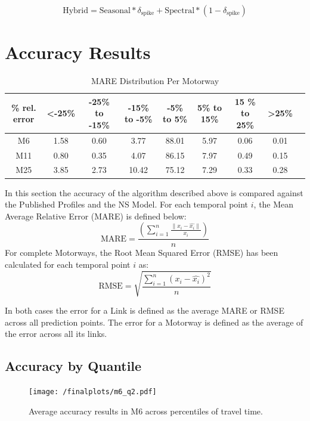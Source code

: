 \documentclass[letterpaper, 10 pt, conference]{ieeeconf}  %
\begin{document}
\begin{equation}
\textrm{Hybrid} = \textrm{Seasonal} * \delta_{\textrm{spike}} + \textrm{Spectral} * (1 - \delta_{\textrm{spike}})
\end{equation}

\section{Accuracy Results}
\begin{table}[bp]
	\caption{MARE Distribution Per Motorway}
	\centering
	\begin{center}
		\begin{tabular}{|C|C|C|C|C|C|C|C|C|}
			\hline
			\textbf{\% rel. error}&{\textless -25\%}&{-25\%\textbf{ to }-15\%}&{-15\%\textbf{ to }-5\%}&{-5\%\textbf{ to }5\%}&{5\%\textbf{ to }15\%}&{15 \%\textbf{ to }25\%}&{\textgreater 25\%}\\
			\hline
			M6& 1.58& 0.60& 3.77& 88.01& 5.97& 0.06& 0.01\\
			\hline
			M11& 0.80& 0.35& 4.07& 86.15& 7.97& 0.49& 0.15\\
			\hline
			M25& 3.85& 2.73& 10.42& 75.12& 7.29& 0.33& 0.28\\
			\hline
		\end{tabular}
		\label{mapeglobal}
	\end{center}
\end{table}
  
In this section the accuracy of the algorithm described above is compared against the Published Profiles and the NS Model. 
For each temporal point $i$, the Mean Average Relative Error (MARE) is defined below:
\begin{equation}
\textrm{MARE} =\frac{ \left( \sum_{i=1}^{n} \frac{\|x_i - \hat{x_i}\|}{x_i}\right)}{n}
\end{equation}
For complete Motorways, the Root Mean Squared Error (RMSE) has been calculated for each temporal point $i$ as:
\begin{equation}
\textrm{RMSE} = \sqrt{\frac{\sum_{i=1}^{n} (x_i - \hat{x_i})^2}{n}}
\end{equation}

In both cases the error for a Link is defined as the average MARE or RMSE across all prediction points.
The error for a Motorway is defined as the average of the error across all its links.

\subsection{Accuracy by Quantile}
\begin{figure}[htbp]
	\centerline{\texttt{[image: /finalplots/m6\_q2.pdf]}}
	\caption{Average accuracy results in M6 across percentiles of travel time.}
	\label{fig:m6q}
\end{figure}
\end{document}
